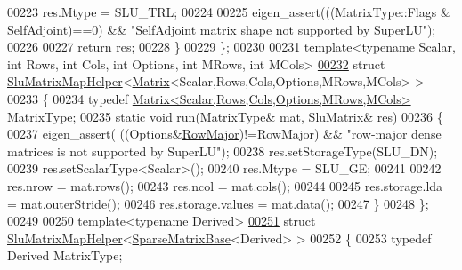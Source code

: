 \begin{DoxyCode}
00223       res.Mtype = SLU\_TRL;
00224 
00225     eigen\_assert(((MatrixType::Flags & \hyperlink{group__enums_gga39e3366ff5554d731e7dc8bb642f83cda2491fc6765056421f504eb7e16083e8f}{SelfAdjoint})==0) && \textcolor{stringliteral}{"SelfAdjoint matrix shape not
       supported by SuperLU"});
00226 
00227     \textcolor{keywordflow}{return} res;
00228   \}
00229 \};
00230 
00231 \textcolor{keyword}{template}<\textcolor{keyword}{typename} Scalar, \textcolor{keywordtype}{int} Rows, \textcolor{keywordtype}{int} Cols, \textcolor{keywordtype}{int} Options, \textcolor{keywordtype}{int} MRows, \textcolor{keywordtype}{int} MCols>
\hyperlink{struct_eigen_1_1_slu_matrix_map_helper_3_01_matrix_3_01_scalar_00_01_rows_00_01_cols_00_01_optioce31c400c0dc6b34c9e9bbf922bc7aae}{00232} \textcolor{keyword}{struct }\hyperlink{struct_eigen_1_1_slu_matrix_map_helper}{SluMatrixMapHelper}<\hyperlink{group___core___module_class_eigen_1_1_matrix}{Matrix}<Scalar,Rows,Cols,Options,MRows,MCols> >
00233 \{
00234   \textcolor{keyword}{typedef} \hyperlink{group___core___module_class_eigen_1_1_matrix}{Matrix<Scalar,Rows,Cols,Options,MRows,MCols>} 
      \hyperlink{group___core___module_class_eigen_1_1_matrix}{MatrixType};
00235   \textcolor{keyword}{static} \textcolor{keywordtype}{void} run(MatrixType& mat, \hyperlink{struct_eigen_1_1_slu_matrix}{SluMatrix}& res)
00236   \{
00237     eigen\_assert( ((Options&\hyperlink{group__enums_ggaacded1a18ae58b0f554751f6cdf9eb13acfcde9cd8677c5f7caf6bd603666aae3}{RowMajor})!=RowMajor) && \textcolor{stringliteral}{"row-major dense matrices is not supported by
       SuperLU"});
00238     res.setStorageType(SLU\_DN);
00239     res.setScalarType<Scalar>();
00240     res.Mtype     = SLU\_GE;
00241 
00242     res.nrow      = mat.rows();
00243     res.ncol      = mat.cols();
00244 
00245     res.storage.lda       = mat.outerStride();
00246     res.storage.values    = mat.\hyperlink{class_eigen_1_1_plain_object_base_ac25699535374b1854cf8494e44ad31b2}{data}();
00247   \}
00248 \};
00249 
00250 \textcolor{keyword}{template}<\textcolor{keyword}{typename} Derived>
\hyperlink{struct_eigen_1_1_slu_matrix_map_helper_3_01_sparse_matrix_base_3_01_derived_01_4_01_4}{00251} \textcolor{keyword}{struct }\hyperlink{struct_eigen_1_1_slu_matrix_map_helper}{SluMatrixMapHelper}<\hyperlink{group___sparse_core___module_class_eigen_1_1_sparse_matrix_base}{SparseMatrixBase}<Derived> >
00252 \{
00253   \textcolor{keyword}{typedef} Derived MatrixType;

\end{DoxyCode}
